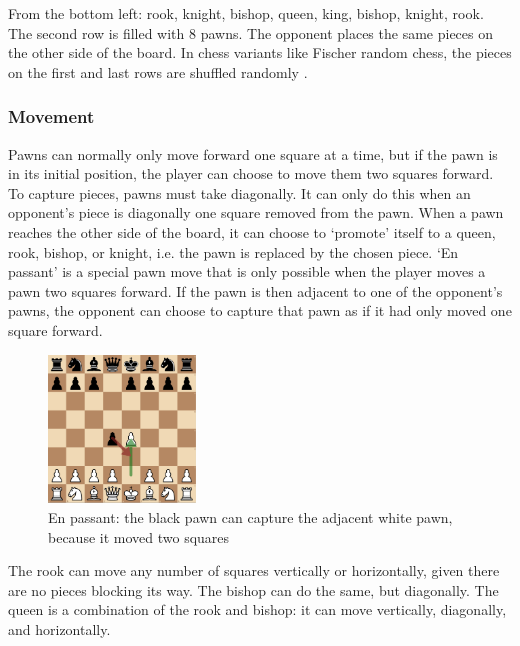 \documentclass{article}
\begin{document}
From the bottom left: rook, knight, bishop, queen, king, bishop, knight, rook.
The second row is filled with 8 pawns. The opponent places the same pieces on the other side of the board.
In chess variants like Fischer random chess, the pieces on the first and last rows are shuffled randomly \cite{FischerRandomChess2022}.

\subsubsection{Movement}

Pawns can normally only move forward one square at a time, but if the pawn is in its initial position, the player can choose to move them two squares forward.
To capture pieces, pawns must take diagonally. It can only do this when an opponent's piece is diagonally one square removed from the pawn.
When a pawn reaches the other side of the board, it can choose to `promote' itself to a queen, rook, bishop, or knight, i.e. the pawn is 
replaced by the chosen piece. `En passant' is a special pawn move that is only possible when the player moves a pawn two squares forward. 
If the pawn is then adjacent to one of the opponent's pawns, the opponent can choose to capture that pawn as if it had only moved one square forward.

\begin{figure}[H]
    \centering
    \includegraphics[width=0.35\textwidth]{img/en-passant.png}
    \caption{En passant: the black pawn can capture the adjacent white pawn, because it moved two squares}
\end{figure}

The rook can move any number of squares vertically or horizontally, given there are no pieces blocking its way.
The bishop can do the same, but diagonally. The queen is a combination of the rook and bishop: it can move vertically, diagonally, and horizontally.
\end{document}
